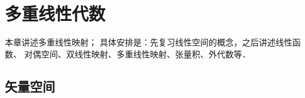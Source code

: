 
\chapter{多重线性代数}\label{chmla} %


本章讲述多重线性映射；
具体安排是：先复习线性空间的概念，之后讲述线性函数、
对偶空间、双线性映射、多重线性映射、张量积、外代数等．






\section{矢量空间}\label{chmla:sec_linear-space}

  

